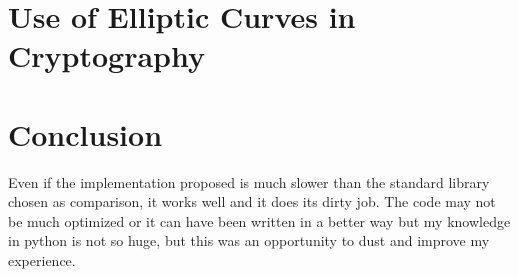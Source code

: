 \documentclass{article}
\begin{document}

\section{Use of Elliptic Curves in Cryptography}



\section{Conclusion}

Even if the implementation proposed is much slower than the standard library chosen as comparison, it works well and it does its dirty job. The code may not be much optimized or it can have been written in a better way but my knowledge in python is not so huge, but this was an opportunity to dust and improve my experience.





%

\end{document}
